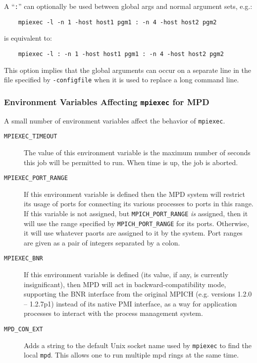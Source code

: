 \documentclass[dvipdfm,11pt]{article}
\begin{document}
\begin{description}
\end{description}

A ``\texttt{:}'' can optionally be used between global args
and normal argument sets, e.g.:
\begin{verbatim}
    mpiexec -l -n 1 -host host1 pgm1 : -n 4 -host host2 pgm2
\end{verbatim}
is equivalent to:
\begin{verbatim}
    mpiexec -l : -n 1 -host host1 pgm1 : -n 4 -host host2 pgm2
\end{verbatim}
This option implies that the global arguments can occur on a separate
line in the file specified by \texttt{-configfile} when it is used to 
replace a long command line.

\subsubsection{Environment Variables Affecting \texttt{mpiexec} for MPD}
\label{sec:mpd-mpiexec-env}

A small number of environment variables affect the behavior of
\texttt{mpiexec}. 

\begin{description}
\item[\texttt{MPIEXEC\_TIMEOUT}] The value of this environment variable is the
  maximum number of seconds this job will be permitted to run.  When
  time is up, the job is aborted.
\item[\texttt{MPIEXEC\_PORT\_RANGE}] If this environment variable is
  defined then the MPD system will restrict its usage of ports for
  connecting its various processes to ports in this range.  If this
  variable is not assigned, but \texttt{MPICH\_PORT\_RANGE} \emph{is}
  assigned, then it will use the range specified by
  \texttt{MPICH\_PORT\_RANGE} for its ports.  Otherwise, it will use
  whatever paorts are assigned to it by the system.  Port ranges are
  given as a pair of integers separated by a colon.
\item[\texttt{MPIEXEC\_BNR}] If this environment variable is defined
  (its value, if any, is currently insignificant), then MPD will act in
  backward-compatibility mode, supporting the BNR interface from the
  original MPICH (e.g. versions 1.2.0 -- 1.2.7p1)
  instead of its native PMI interface, as a way for application
  processes to interact with the process management system.
\item[\texttt{MPD\_CON\_EXT}] Adds a string to the default Unix socket
  name used by \texttt{mpiexec} to find the local \texttt{mpd}.  This
  allows one to run multiple mpd rings at the same time.
\end{description}
\end{document}
